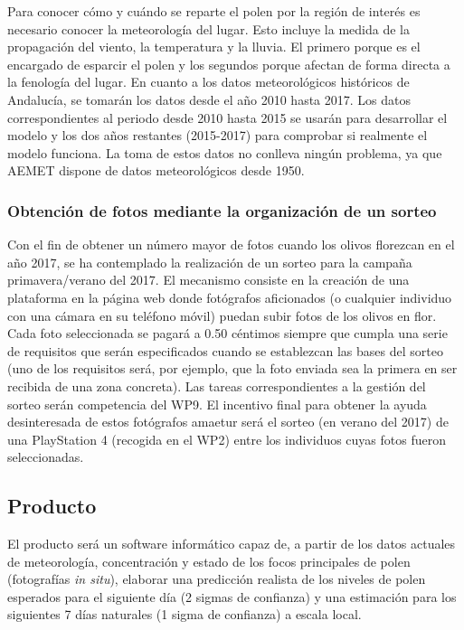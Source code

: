 \documentclass[12pt,oneside,a4paper]{article}
\numberwithin{figure}{section}
\begin{document}
Para conocer cómo y cuándo se reparte el polen por la región de interés es necesario conocer la meteorología del lugar. Esto incluye la medida de la propagación del viento, la temperatura y la lluvia. El primero porque es el encargado de esparcir el polen y los segundos porque afectan de forma directa a la fenología del lugar. En cuanto a los datos meteorológicos históricos de Andalucía, se tomarán los datos desde el año 2010 hasta 2017. Los datos correspondientes al periodo desde 2010 hasta 2015 se usarán para desarrollar el modelo y los dos años restantes (2015-2017) para comprobar si realmente el modelo funciona. La toma de estos datos no conlleva ningún problema, ya que AEMET dispone de datos meteorológicos desde 1950.

\subsubsection{Obtención de fotos mediante la organización de un sorteo}

Con el fin de obtener un número mayor de fotos cuando los olivos florezcan en el año 2017, se ha contemplado la realización de un sorteo para la campaña primavera/verano del 2017. El mecanismo consiste en la creación de una plataforma en la página web donde fotógrafos aficionados (o cualquier individuo con una cámara en su teléfono móvil) puedan subir fotos de los olivos en flor. Cada foto seleccionada se pagará a 0.50 céntimos siempre que cumpla una serie de requisitos que serán especificados cuando se establezcan las bases del sorteo (uno de los requisitos será, por ejemplo, que la foto enviada sea la primera en ser recibida de una zona concreta). Las tareas correspondientes a la gestión del sorteo serán competencia del WP9. El incentivo final para obtener la ayuda desinteresada de estos fotógrafos amaetur será el sorteo (en verano del 2017) de una PlayStation 4 (recogida en el WP2) entre los individuos cuyas fotos fueron seleccionadas. 

\subsection{Producto}

El producto será un software informático capaz de, a partir de los datos actuales de meteorología, concentración y estado de los focos principales de polen (fotografías \textit{in situ}), elaborar una predicción realista de los niveles de polen esperados para el siguiente día (2 sigmas de confianza) y una estimación para los siguientes 7 días naturales (1 sigma de confianza) a escala local.
\end{document}
